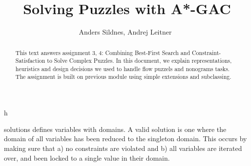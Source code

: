 \documentclass[journal]{IEEEtran}
\begin{document}
%
\title{Solving Puzzles with A*-GAC}

\author{Anders Sildnes, Andrej Leitner~%
}%

%
{h}

\maketitle

\begin{abstract}
    This text answers assignment 3, 4: Combining Best-First Search and Constraint-Satisfaction to Solve Complex Puzzles.  
    In this document, we explain representations, heuristics and design decisions we used to handle flow puzzels and nonograms tasks. 
    The assignment is built on previous module using simple extensions and subclassing.
\end{abstract}

 solutions defines variables with domains.
A valid solution is one where the domain of all variables has been reduced to the
singleton domain. This occurs by making sure that a) no constraints are violated
and b) all variables are iterated over, and been locked to a single value in their
domain.
\end{document}
